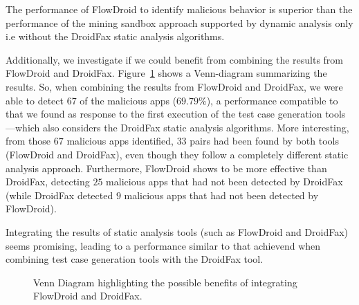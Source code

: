 \begin{finding}
  The performance of FlowDroid to identify malicious behavior
  is superior than the performance of the
  mining sandbox approach supported by dynamic analysis only i.e without
  the DroidFax static analysis algorithms.
\end{finding}

Additionally, we investigate if we could benefit from combining
the results from FlowDroid and DroidFax. Figure~\ref{fig:venn-plot2} shows a
Venn-diagram summarizing the results. So, when combining
the results from FlowDroid and DroidFax, we were able to detect
$67$ of the malicious apps ($69.79$\%), a performance compatible
to that we found as response to the first execution of the
test case generation tools---which also considers the DroidFax
static analysis algorithms. More interesting, from those $67$
malicious apps identified, $33$ pairs had been found by
both tools (FlowDroid and DroidFax), even though they follow
a completely different static analysis approach. Furthermore,
FlowDroid shows to be more effective than DroidFax, detecting $25$ malicious
apps that had not been detected by DroidFax (while DroidFax detected $9$
malicious apps that had not been detected by FlowDroid).

\begin{finding}
  Integrating the results of static analysis tools
  (such as FlowDroid and DroidFax) seems promising,
  leading to a performance similar to that achievend
  when combining test case generation tools with the
  DroidFax tool. 
\end{finding}

\begin{figure}
  \caption{Venn Diagram highlighting the possible benefits of
    integrating FlowDroid and DroidFax.}
  \label{fig:venn-plot2}

\end{figure}

